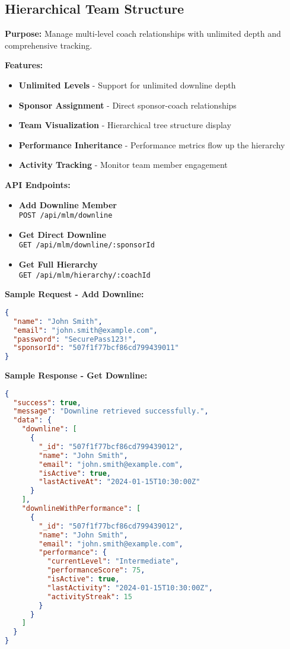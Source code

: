\documentclass[12pt,a4paper]{article}
\newcommand{\apiendpoint}[2]{\textbf{#1} \\ \texttt{#2}}
\newcommand{\samplecode}[1]{\begin{lstlisting}[language=JSON]#1\end{lstlisting}}
\begin{document}
\subsection{Hierarchical Team Structure}
\textbf{Purpose:} Manage multi-level coach relationships with unlimited depth and comprehensive tracking.

\textbf{Features:}
\begin{itemize}
    \item \textbf{Unlimited Levels} - Support for unlimited downline depth
    \item \textbf{Sponsor Assignment} - Direct sponsor-coach relationships
    \item \textbf{Team Visualization} - Hierarchical tree structure display
    \item \textbf{Performance Inheritance} - Performance metrics flow up the hierarchy
    \item \textbf{Activity Tracking} - Monitor team member engagement
\end{itemize}

\textbf{API Endpoints:}
\begin{itemize}
    \item \apiendpoint{Add Downline Member}{POST /api/mlm/downline}
    \item \apiendpoint{Get Direct Downline}{GET /api/mlm/downline/:sponsorId}
    \item \apiendpoint{Get Full Hierarchy}{GET /api/mlm/hierarchy/:coachId}
\end{itemize}

\textbf{Sample Request - Add Downline:}
\samplecode{
{
  "name": "John Smith",
  "email": "john.smith@example.com",
  "password": "SecurePass123!",
  "sponsorId": "507f1f77bcf86cd799439011"
}
}

\textbf{Sample Response - Get Downline:}
\samplecode{
{
  "success": true,
  "message": "Downline retrieved successfully.",
  "data": {
    "downline": [
      {
        "_id": "507f1f77bcf86cd799439012",
        "name": "John Smith",
        "email": "john.smith@example.com",
        "isActive": true,
        "lastActiveAt": "2024-01-15T10:30:00Z"
      }
    ],
    "downlineWithPerformance": [
      {
        "_id": "507f1f77bcf86cd799439012",
        "name": "John Smith",
        "email": "john.smith@example.com",
        "performance": {
          "currentLevel": "Intermediate",
          "performanceScore": 75,
          "isActive": true,
          "lastActivity": "2024-01-15T10:30:00Z",
          "activityStreak": 15
        }
      }
    ]
  }
}
}
\end{document}
